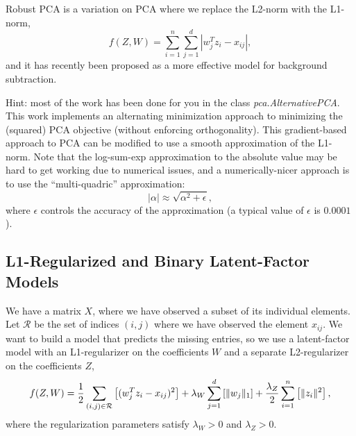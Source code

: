 \documentclass{article}
\begin{document}
Robust PCA is a variation on PCA where we replace the L2-norm with the L1-norm,
\[
f(Z,W) = \sum_{i=1}^n\sum_{j=1}^d |w_j^Tz_i - x_{ij}|,
\]
and it has recently been proposed as a more effective model for background subtraction. 

Hint: most of the work has been done for you in the class \emph{pca.AlternativePCA}. This work implements an alternating minimization approach to minimizing the (squared) PCA objective (without enforcing orthogonality). This gradient-based approach to PCA can be modified to use a smooth approximation of the L1-norm. Note that the log-sum-exp approximation to the absolute value may be hard to get working due to numerical issues, and a numerically-nicer approach is to use the ``multi-quadric'' approximation:
\[
|\alpha| \approx \sqrt{\alpha^2 + \epsilon},
\]
where $\epsilon$ controls the accuracy of the approximation (a typical value of $\epsilon$ is $0.0001$).

\subsection{L1-Regularized and Binary Latent-Factor Models}

We have a matrix $X$, where we have observed a subset of its individual elements. Let $\mathcal{R}$ be the set of indices $(i,j)$ where we have observed the element $x_{ij}$. We want to build a model that predicts the missing entries, so we use a latent-factor model with an L1-regularizer on the coefficients $W$ and a separate L2-regularizer on the coefficients $Z$,
\[
f(Z,W) = \frac{1}{2}\sum_{(i,j) \in \mathcal{R}}\left[(w_j^Tz_i - x_{ij})^2 \right] + \lambda_W \sum_{j=1}^d \left[\|w_j\|_1\right] + \frac{\lambda_Z}{2} \sum_{i=1}^n \left[\|z_i\|^2\right],
\]
where the regularization parameters satisfy $\lambda_W > 0$ and $\lambda_Z > 0$.
\end{document}
